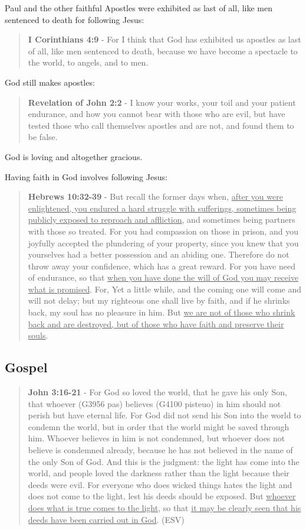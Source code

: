 \documentclass[11pt]{article}
\begin{document}
Paul and the other faithful Apostles were exhibited as last of all, like men sentenced to death for following Jesus:

\begin{quote}
\textbf{I Corinthians 4:9} - For I think that God has exhibited us apostles as last of all, like men sentenced to death, because we have become a spectacle to the world, to angels, and to men.
\end{quote}

God still makes apostles:

\begin{quote}
\textbf{Revelation of John 2:2} - I know your works, your toil and your patient endurance, and how you cannot bear with those who are evil, but have tested those who call themselves apostles and are not, and found them to be false.
\end{quote}

God is loving and altogether gracious.

Having faith in God involves following Jesus:

\begin{quote}
\textbf{Hebrews 10:32-39} - But recall the former days when, \uline{after you were enlightened, you endured a hard struggle with sufferings, sometimes being publicly exposed to reproach and affliction}, and sometimes being partners with those so treated. For you had compassion on those in prison, and you joyfully accepted the plundering of your property, since you knew that you yourselves had a better possession and an abiding one. Therefore do not throw away your confidence, which has a great reward. For you have need of endurance, so that \uline{when you have done the will of God you may receive what is promised}. For, Yet a little while, and the coming one will come and will not delay; but my righteous one shall live by faith, and if he shrinks back, my soul has no pleasure in him. But \uline{we are not of those who shrink back and are destroyed, but of those who have faith and preserve their souls}.
\end{quote}

\subsection{Gospel}
\label{sec:org66b2142}
\begin{quote}
\textbf{John 3:16-21} - For God so loved the world, that he gave his only Son, that whoever (G3956 pas) believes (G4100 pisteuo) in him should not perish but have eternal life. For God did not send his Son into the world to condemn the world, but in order that the world might be saved through him. Whoever believes in him is not condemned, but whoever does not believe is condemned already, because he has not believed in the name of the only Son of God. And this is the judgment: the light has come into the world, and people loved the darkness rather than the light because their deeds were evil. For everyone who does wicked things hates the light and does not come to the light, lest his deeds should be exposed. But \uline{whoever does what is true comes to the light}, so that \uline{it may be clearly seen that his deeds have been carried out in God}. (ESV)
\end{quote}
\end{document}
